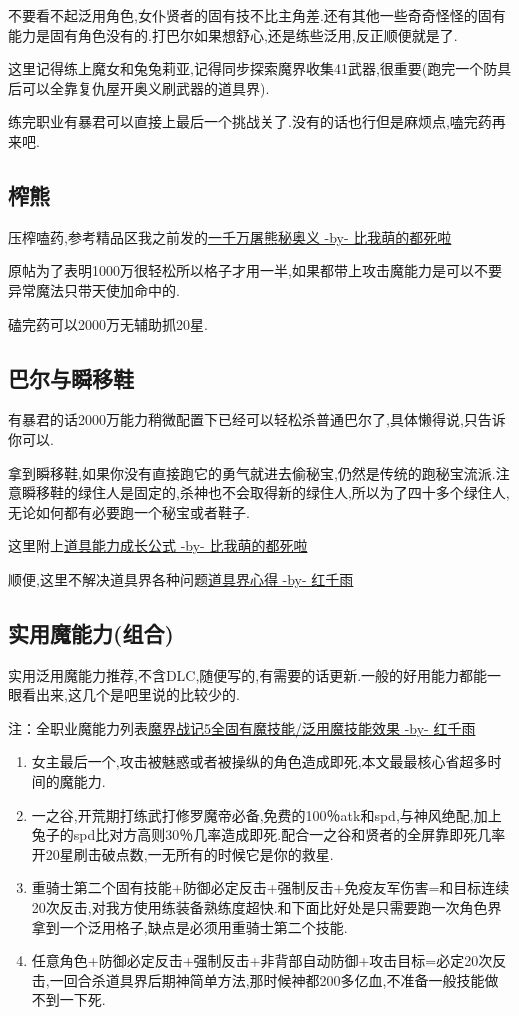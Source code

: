		不要看不起泛用角色,女仆贤者的固有技不比主角差.还有其他一些奇奇怪怪的固有能力是固有角色没有的.打巴尔如果想舒心,还是练些泛用,反正顺便就是了.

		这里记得练上魔女和兔兔莉亚,记得同步探索魔界收集41武器,很重要(跑完一个防具后可以全靠复仇屋开奥义刷武器的道具界).

		练完职业有暴君可以直接上最后一个挑战关了.没有的话也行但是麻烦点,嗑完药再来吧.

	\subsection{榨熊}

	压榨嗑药,参考精品区我之前发的\href{http://tieba.baidu.com/p/3825275063}{一千万屠熊秘奥义 -by- 比我萌的都死啦}

	原帖为了表明1000万很轻松所以格子才用一半,如果都带上攻击魔能力是可以不要异常魔法只带天使加命中的.

	磕完药可以2000万无辅助抓20星.
		

	\subsection{巴尔与瞬移鞋}

	有暴君的话2000万能力稍微配置下已经可以轻松杀普通巴尔了,具体懒得说,只告诉你可以.

	拿到瞬移鞋,如果你没有直接跑它的勇气就进去偷秘宝,仍然是传统的跑秘宝流派.注意瞬移鞋的绿住人是固定的,杀神也不会取得新的绿住人,所以为了四十多个绿住人,无论如何都有必要跑一个秘宝或者鞋子.

	这里附上\href{http://tieba.baidu.com/f?kz=3834692385}{道具能力成长公式 -by- 比我萌的都死啦}

	顺便,这里不解决道具界各种问题\href{http://tieba.baidu.com/p/3730196003}{道具界心得 -by- 红千雨}

	\subsection{实用魔能力(组合)}

	实用泛用魔能力推荐,不含DLC,随便写的,有需要的话更新.一般的好用能力都能一眼看出来,这几个是吧里说的比较少的.

	注：全职业魔能力列表\href{http://tieba.baidu.com/p/3765501530}{魔界战记5全固有魔技能/泛用魔技能效果 -by- 红千雨}

	\begin{enumerate}
		\item
		女主最后一个,攻击被魅惑或者被操纵的角色造成即死,本文最最核心省超多时间的魔能力.
		\item
		一之谷,开荒期打练武打修罗魔帝必备,免费的100％atk和spd,与神风绝配,加上兔子的spd比对方高则30％几率造成即死.配合一之谷和贤者的全屏靠即死几率开20星刷击破点数,一无所有的时候它是你的救星.
		\item
		重骑士第二个固有技能+防御必定反击+强制反击+免疫友军伤害=和目标连续20次反击,对我方使用练装备熟练度超快.和下面比好处是只需要跑一次角色界拿到一个泛用格子,缺点是必须用重骑士第二个技能.
		\item
		任意角色+防御必定反击+强制反击+非背部自动防御+攻击目标=必定20次反击,一回合杀道具界后期神简单方法,那时候神都200多亿血,不准备一般技能做不到一下死.
	\end{enumerate}



